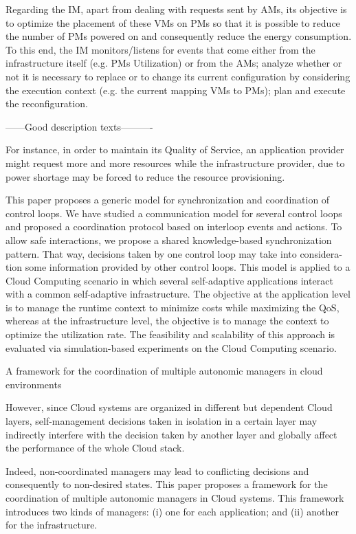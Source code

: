 Regarding the IM, apart from dealing with requests sent by AMs, its objective is to optimize the placement of these VMs on PMs so that it is possible to reduce the number of PMs powered on and consequently reduce the energy
consumption. To this end, the IM monitors/listens for events that come either from the infrastructure itself (e.g. PMs Utilization) or from the AMs; analyze whether or not it is necessary to replace or to change its current configuration by considering the execution context (e.g. the current mapping VMs to PMs); plan and execute the reconfiguration.



------Good description texts----------


For instance, in order to maintain its Quality of Service, an application provider might request more and more resources while the infrastructure provider, due to power shortage may be forced to reduce the resource provisioning.

This paper proposes a generic model for synchronization and coordination of
control loops. We have studied a communication model for several control loops
and proposed a coordination protocol based on interloop events and actions. To
allow safe interactions, we propose a shared knowledge-based synchronization
pattern. That way, decisions taken by one control loop may take into considera-
tion some information provided by other control loops. This model is applied to
a Cloud Computing scenario in which several self-adaptive applications interact
with a common self-adaptive infrastructure. The objective at the application
level is to manage the runtime context to minimize costs while maximizing the
QoS, whereas at the infrastructure level, the objective is to manage the context
to optimize the utilization rate. The feasibility and scalability of this approach is
evaluated via simulation-based experiments on the Cloud Computing scenario.



A framework for the coordination of multiple autonomic managers in cloud environments

However, since Cloud systems are organized in different but dependent Cloud layers, self-management decisions taken in isolation in a certain layer may indirectly interfere with the decision taken by another layer and globally affect the performance of the whole Cloud stack. 

Indeed, non-coordinated managers may lead to conflicting decisions and consequently to non-desired states. This paper proposes a framework for the coordination of multiple autonomic managers in Cloud systems. This framework introduces two kinds of managers: (i) one for each application; and (ii) another for the infrastructure. 

